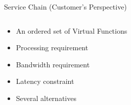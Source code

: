 \begin{frame}{Service Chain \small (Customer's Perspective)}
\begin{columns}
\begin{column}{.6\textwidth}
\begin{itemize}[<+>]
  \item An ordered set of Virtual Functions
  \item Processing requirement
  \item Bandwidth requirement
  \item Latency constraint
  \item Several alternatives
\end{itemize}
\end{column}
\begin{column}{.4\textwidth}
\begin{center}

\end{center}
\end{column}
\end{columns}
\end{frame}